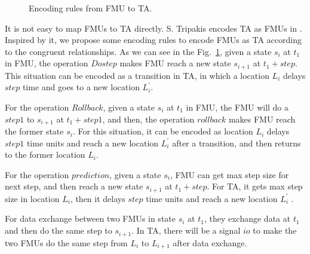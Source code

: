 \begin{figure}[htbp]
	\caption{Encoding rules from FMU to TA.}
	\label{fmutota}
\end{figure}

It is not easy to map FMUs to TA directly. S. Tripakis encodes TA as FMUs in \cite{Tripakis15}. Inspired by it, we propose some encoding rules to encode FMUs as TA according to the congruent relationships. As we can see in the Fig.~\ref{fmutota}, given a state $s_{i}$ at $t_{1}$ in FMU, the operation $Dostep$ makes FMU reach a new state $s_{i+1}$ at $t_{1}+step$. This situation can be encoded as a transition in TA, in which a location $L_{i}$ delays $step$ time and goes to a new location $L_{i}^{\prime}$.

For the operation $Rollback$, given a state $s_{i}$ at $t_{1}$ in FMU, the FMU will do a $step1$ to $s_{i+1}$ at $t_{1}+step1$, and then, the operation $rollback$ makes FMU reach the former state $s_{i}$. For this situation, it can be encoded as location $L_{i}$ delays $step1$ time units and reach a new location $L_{i}^{\prime}$ after a transition, and then returns to the former location $L_{i}$. 

For the operation $prediction$, given a state $s_{i}$, FMU can get max step size for next step, and then reach a new state $s_{i+1}$ at $t_{1}+step$. For TA, it gets max step size in location $L_{i}$, then it delays $step$ time units and reach a new location $L_{i}^{\prime}$ .

For data exchange between two FMUs in state $s_{i}$ at $t_{1}$, they exchange data at $t_{1}$ and then do the same step to $s_{i+1}$. In TA, there will be a signal $io$ to make the two FMUs do the same step from $L_{i}$ to $L_{i+1}$ after data exchange.

